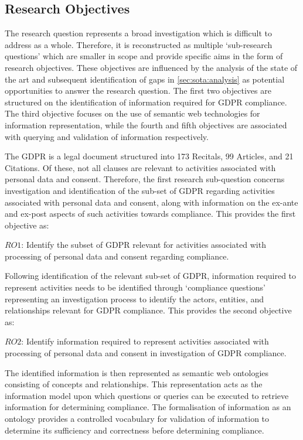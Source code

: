 \subsection{Research Objectives}\label{sec:intro:RO}
The research question represents a broad investigation which is difficult to address as a whole. Therefore, it is reconstructed as multiple `sub-research questions' which are smaller in scope and provide specific aims in the form of research objectives. These objectives are influenced by the analysis of the state of the art and subsequent identification of gaps in \autoref{sec:sota:analysis} as potential opportunities to answer the research question. 
The first two objectives are structured on the identification of information required for GDPR compliance. The third objective focuses on the use of semantic web technologies for information representation, while the fourth and fifth objectives are associated with querying and validation of information respectively.

The GDPR is a legal document structured into 173 Recitals, 99 Articles, and 21 Citations. Of these, not all clauses are relevant to activities associated with personal data and consent. Therefore, the first research sub-question concerns investigation and identification of the sub-set of GDPR regarding activities associated with personal data and consent, along with information on the ex-ante and ex-post aspects of such activities towards compliance. This provides the first objective as:
\begin{framed}
$RO1$: Identify the subset of GDPR relevant for activities associated with processing of personal data and consent regarding compliance.
\end{framed}

Following identification of the relevant sub-set of GDPR, information required to represent activities needs to be identified through `compliance questions' representing an investigation process to identify the actors, entities, and relationships relevant for GDPR compliance. This provides the second objective as:
\begin{framed}
$RO2$: Identify information required to represent activities associated with processing of personal data and consent in investigation of GDPR compliance.
\end{framed}

The identified information is then represented as semantic web ontologies consisting of concepts and relationships. This representation acts as the information model upon which questions or queries can be executed to retrieve information for determining compliance. The formalisation of information as an ontology provides a controlled vocabulary for validation of information to determine its sufficiency and correctness before determining compliance. 

